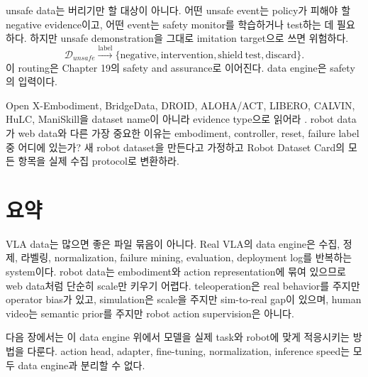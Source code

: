 unsafe data는 버리기만 할 대상이 아니다. 어떤 unsafe event는 policy가 피해야 할 negative evidence이고, 어떤 event는 safety monitor를 학습하거나 test하는 데 필요하다. 하지만 unsafe demonstration을 그대로 imitation target으로 쓰면 위험하다.
\begin{equation}
  \mathcal{D}_{unsafe}
  \xrightarrow{\mathrm{label}}
  \{
  \mathrm{negative},
  \mathrm{intervention},
  \mathrm{shield\ test},
  \mathrm{discard}
  \}.
  \label{eq:ch14-unsafe-routing}
\end{equation}
이 routing은 Chapter 19의 safety and assurance로 이어진다. data engine은 safety의 입력이다.

\chapterwork
{Open X-Embodiment, BridgeData, DROID, ALOHA/ACT, LIBERO, CALVIN, HuLC, ManiSkill을 dataset name이 아니라 evidence type으로 읽어라 \cite{openx2023,bridgedatav22023,droid2024,act2023,libero2023,calvin2022,hulc2022,maniskill22023}.}
{robot data가 web data와 다른 가장 중요한 이유는 embodiment, controller, reset, failure label 중 어디에 있는가?}
{새 robot dataset을 만든다고 가정하고 Robot Dataset Card의 모든 항목을 실제 수집 protocol로 변환하라.}

\section{요약}

VLA data는 많으면 좋은 파일 묶음이 아니다. Real VLA의 data engine은 수집, 정제, 라벨링, normalization, failure mining, evaluation, deployment log를 반복하는 system이다. robot data는 embodiment와 action representation에 묶여 있으므로 web data처럼 단순히 scale만 키우기 어렵다. teleoperation은 real behavior를 주지만 operator bias가 있고, simulation은 scale을 주지만 sim-to-real gap이 있으며, human video는 semantic prior를 주지만 robot action supervision은 아니다.

다음 장에서는 이 data engine 위에서 모델을 실제 task와 robot에 맞게 적응시키는 방법을 다룬다. action head, adapter, fine-tuning, normalization, inference speed는 모두 data engine과 분리할 수 없다.
